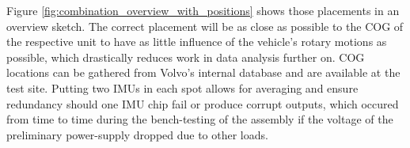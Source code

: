 \documentclass[ExampleMasters.tex]{subfiles}
\begin{document}
Figure \ref{fig:combination_overview_with_positions} shows those placements in an overview sketch. The correct placement will be as close as possible to the \gls{COG} of the respective unit to have as little influence of the vehicle's rotary motions as possible, which drastically reduces work in  data analysis further on. \gls{COG}  locations can be gathered from Volvo's internal database and are available at the test site. Putting two \gls{IMU}s in each spot allows for averaging and ensure redundancy should one \gls{IMU} chip fail or produce corrupt outputs, which occured from time to time during the bench-testing of the assembly if the voltage of the preliminary power-supply dropped due to other loads.\\
\end{document}
